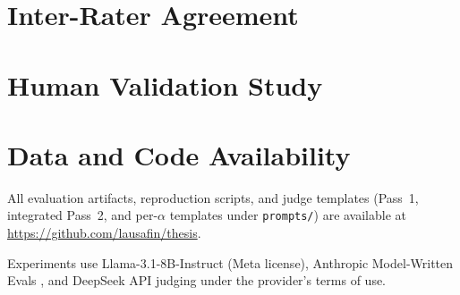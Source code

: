 \documentclass[11pt,a4paper]{article}
\begin{document}
\section{Inter-Rater Agreement}\label{ap:iaa}


\section{Human Validation Study}\label{ap:human_validation}


\section{Data and Code Availability}\label{ap:data_availability}
All evaluation artifacts, reproduction scripts, and judge templates (Pass~1, integrated Pass~2, and per-$\alpha$ templates under \texttt{prompts/}) are available at \url{https://github.com/lausafin/thesis}.

Experiments use Llama-3.1-8B-Instruct (Meta license), Anthropic Model-Written Evals \citep{perezDiscoveringLanguageModel2022}, and DeepSeek API judging under the provider's terms of use.



\end{document}
